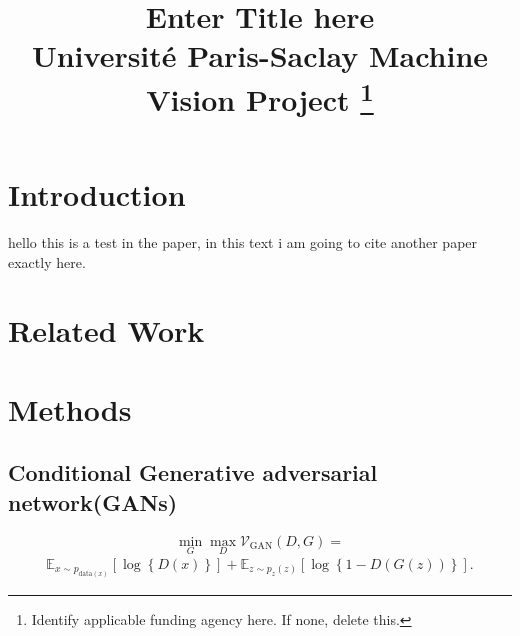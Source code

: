 \documentclass[conference]{IEEEtran}
\begin{document}
\title{Enter Title here\\
{\footnotesize Université Paris-Saclay Machine Vision Project}
\thanks{Identify applicable funding agency here. If none, delete this.}
}

\author{
}

\maketitle

\begin{abstract}

\end{abstract}

\begin{IEEEkeywords}

\end{IEEEkeywords}

\section{Introduction}
hello this is a test in the paper\cite{DBLP:journals/corr/ZhuPIE17}, in this text i am going
to cite another paper exactly here\cite{https://doi.org/10.48550/arxiv.1411.1784}. 

\section{Related Work}


\section{Methods}

\subsection{Conditional Generative adversarial network(GANs)}%


\begin{equation}
\min_{G}\max_{D}\mathcal V_{\text{GAN}}\left(D, G \right) = \end{equation}
\begin{align*}
 \mathbb E_{x \sim p_{\text{data}\left( x\right) }}\left[ \log \left\{ D\left( x \right) \right\} \right] + \mathbb E_{z\sim p_{z}\left( z\right)}\left[ \log\left\{ 1 - D\left( G\left( z\right) \right) \right\}\right].   
\end{align*}
\end{document}
